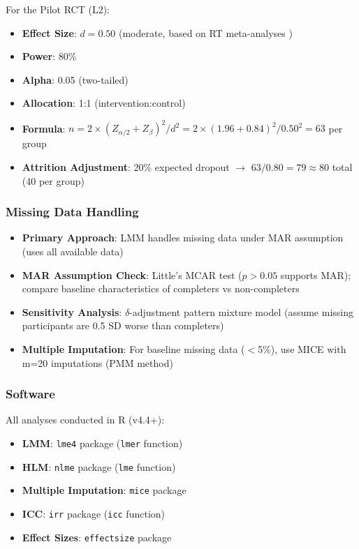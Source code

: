 \documentclass[11pt]{article}
\begin{document}
For the Pilot RCT (L2):
\begin{itemize}
    \item \textbf{Effect Size}: $d = 0.50$ (moderate, based on RT meta-analyses \citep{pu2025,ni2026})
    \item \textbf{Power}: 80\%
    \item \textbf{Alpha}: 0.05 (two-tailed)
    \item \textbf{Allocation}: 1:1 (intervention:control)
    \item \textbf{Formula}: $n = 2 \times (Z_{\alpha/2} + Z_{\beta})^2 / d^2 = 2 \times (1.96 + 0.84)^2 / 0.50^2 = 63$ per group
    \item \textbf{Attrition Adjustment}: 20\% expected dropout $\rightarrow$ $63 / 0.80 = 79 \approx 80$ total (40 per group)
\end{itemize}

\subsubsection{Missing Data Handling}

\begin{itemize}
    \item \textbf{Primary Approach}: LMM handles missing data under MAR assumption (uses all available data)
    \item \textbf{MAR Assumption Check}: Little's MCAR test ($p > 0.05$ supports MAR); compare baseline characteristics of completers vs non-completers
    \item \textbf{Sensitivity Analysis}: $\delta$-adjustment pattern mixture model (assume missing participants are 0.5 SD worse than completers)
    \item \textbf{Multiple Imputation}: For baseline missing data ($<$5\%), use MICE with m=20 imputations (PMM method)
\end{itemize}

\subsubsection{Software}

All analyses conducted in R (v4.4+):
\begin{itemize}
    \item \textbf{LMM}: \texttt{lme4} package (\texttt{lmer} function)
    \item \textbf{HLM}: \texttt{nlme} package (\texttt{lme} function)
    \item \textbf{Multiple Imputation}: \texttt{mice} package
    \item \textbf{ICC}: \texttt{irr} package (\texttt{icc} function)
    \item \textbf{Effect Sizes}: \texttt{effectsize} package
\end{itemize}
\end{document}
